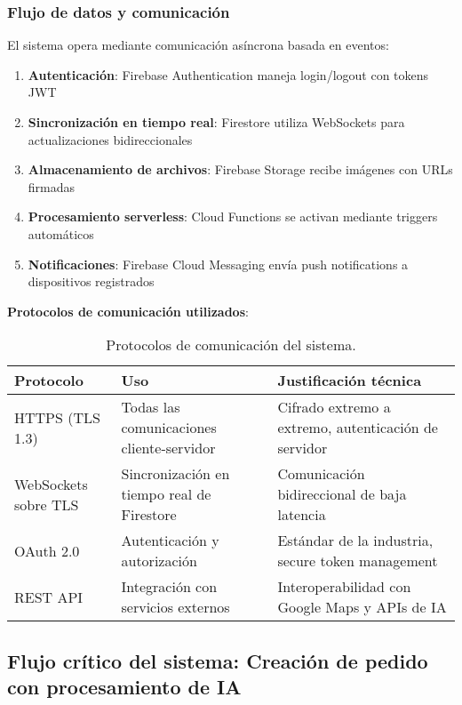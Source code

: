 \subsubsection{Flujo de datos y comunicación}

El sistema opera mediante comunicación asíncrona basada en eventos:

\begin{enumerate}
    \item \textbf{Autenticación}: Firebase Authentication maneja login/logout con tokens JWT
    \item \textbf{Sincronización en tiempo real}: Firestore utiliza WebSockets para actualizaciones bidireccionales
    \item \textbf{Almacenamiento de archivos}: Firebase Storage recibe imágenes con URLs firmadas
    \item \textbf{Procesamiento serverless}: Cloud Functions se activan mediante triggers automáticos
    \item \textbf{Notificaciones}: Firebase Cloud Messaging envía push notifications a dispositivos registrados
\end{enumerate}

\textbf{Protocolos de comunicación utilizados}:

\begin{table}[H]
\centering
\caption{Protocolos de comunicación del sistema.}
\label{tab:protocolos_comunicacion}
\begin{tabular}{@{}p{3.5cm}p{4.5cm}p{5cm}@{}}
\toprule
\textbf{Protocolo} & \textbf{Uso} & \textbf{Justificación técnica} \\
\midrule
HTTPS (TLS 1.3) & Todas las comunicaciones cliente-servidor & Cifrado extremo a extremo, autenticación de servidor \\
\midrule
WebSockets sobre TLS & Sincronización en tiempo real de Firestore & Comunicación bidireccional de baja latencia \\
\midrule
OAuth 2.0 & Autenticación y autorización & Estándar de la industria, secure token management \\
\midrule
REST API & Integración con servicios externos & Interoperabilidad con Google Maps y APIs de IA \\
\bottomrule
\end{tabular}
\end{table}

\subsection{Flujo crítico del sistema: Creación de pedido con procesamiento de IA}

